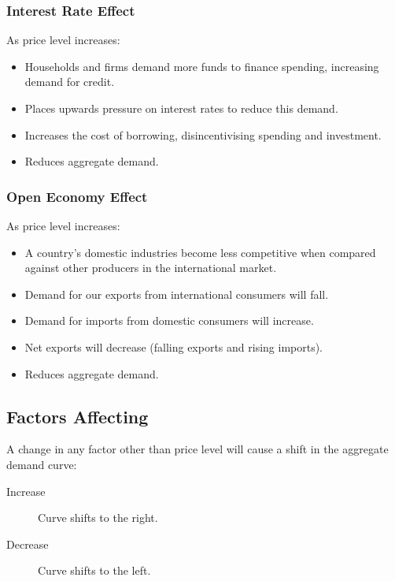 \documentclass[a4paper,11pt]{report}
\begin{document}
\subsubsection{Interest Rate Effect}

As price level increases:

\begin{itemize}
\item Households and firms demand more funds to finance spending, increasing
	demand for credit.
\item Places upwards pressure on interest rates to reduce this demand.
\item Increases the cost of borrowing, disincentivising spending and investment.
\item Reduces aggregate demand.
\end{itemize}

\subsubsection{Open Economy Effect}

As price level increases:

\begin{itemize}
\item A country's domestic industries become less competitive when compared
	against other producers in the international market.
\item Demand for our exports from international consumers will fall.
\item Demand for imports from domestic consumers will increase.
\item Net exports will decrease (falling exports and rising imports).
\item Reduces aggregate demand.
\end{itemize}

\subsection{Factors Affecting}

A change in any factor other than price level will cause a shift in the
aggregate demand curve:

\begin{description}
\item [Increase] Curve shifts to the right.
\item [Decrease] Curve shifts to the left.
\end{description}
\end{document}

